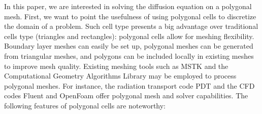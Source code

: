 \documentclass[preprint,10pt]{elsarticle}
\renewcommand{\(}{\left(}
\renewcommand{\)}{\right)}
\renewcommand{\[}{\left[}
\renewcommand{\]}{\right]}
\begin{document}
In this paper, we are interested in solving the diffusion equation on a
polygonal mesh. First, we want to point the usefulness of using polygonal
cells to discretize the domain of a problem. Such cell type presents a big 
advantage over traditional cells type (triangles and rectangles): polygonal 
cells allow for meshing flexibility. Boundary layer meshes can easily be set 
up, polygonal meshes can be generated from triangular meshes, and polygons 
can be included locally in existing meshes to improve mesh quality. Existing 
meshing tools such as MSTK \cite{mstk} and the Computational Geometry Algorithms 
Library \cite{cgal} may be employed to process polygonal meshes. For 
instance, the radiation transport code PDT and the CFD codes Fluent and OpenFoam 
offer polygonal mesh and solver capabilities. The following features of polygonal
cells are noteworthy:
\end{document}
